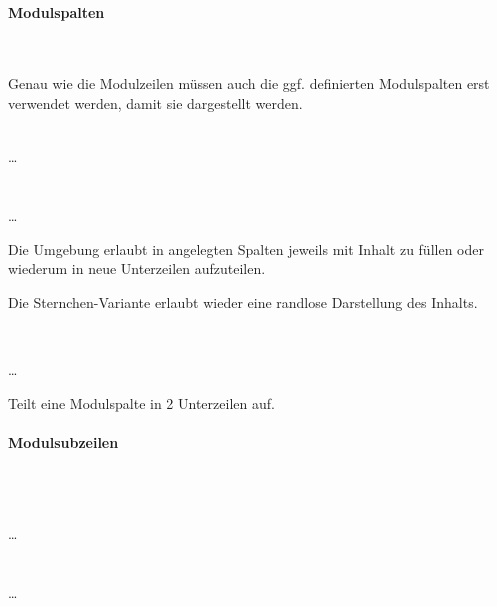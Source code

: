 \paragraph{Modulspalten}~\par

Genau wie die Modulzeilen müssen auch die ggf. definierten Modulspalten
erst verwendet werden, damit sie dargestellt werden.

\begin{Declaration}
    \\%
  \quad\dots\\
  \\
    \\%
  \quad\dots\\
\end{Declaration}

Die Umgebung  erlaubt in  angelegten Spalten
jeweils mit Inhalt zu füllen oder wiederum in neue Unterzeilen aufzuteilen.

Die Sternchen-Variante  erlaubt wieder eine
randlose Darstellung des Inhalts.


\begin{minipage}{0.6\textwidth}
\begin{example}~\par
  \noindent{}
    \par
  \quad\dots\\
  \bigskip\par
  \noindent Teilt eine Modulspalte in 2 Unterzeilen auf.
\end{example}
\end{minipage}
\hfill
\begin{minipage}{0.3\textwidth}\centering
\end{minipage}

\paragraph{Modulsubzeilen}~\par

\begin{Declaration}
  \\%
  \quad\dots\\
  \\
  \\%
  \quad\dots\\
\end{Declaration}


